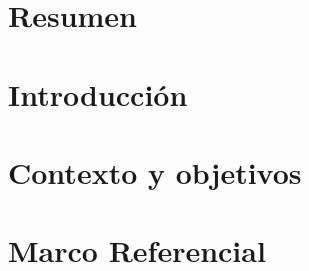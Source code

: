 \documentclass[letterpaper, 11pt, oneside]{book}
\begin{document}
	
\renewcommand{\tablename}{Tabla}



\renewcommand{\thepage}{\roman{page}}
%

\newpage
%


\renewcommand{\contentsname}{Tabla de Contenido}
\tableofcontents

\renewcommand{\listfigurename}{Lista de Figuras}
\listoffigures 

\renewcommand{\listtablename}{Lista de tablas}
\listoftables

\chapter*{Resumen}
\label{capResumen}



\thispagestyle{empty}


\chapter*{Introducción}
\label{capIntro}

\thispagestyle{empty}


\chapter{Contexto y objetivos}
\label{cap1}
\renewcommand{\thepage}{\arabic{page}}
\setcounter{page}{1}










\chapter[Marco Referencial]{Marco Referencial}
\label{cap2}
\end{document}
